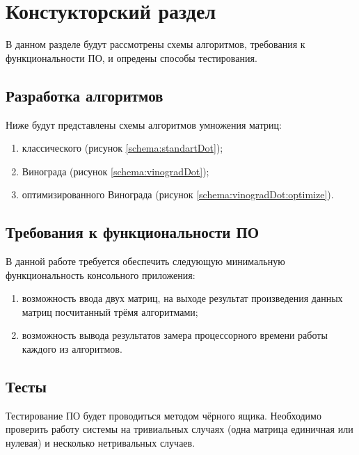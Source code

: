 \chapter{ Констукторский раздел}
\label{cha:design}
    В данном разделе будут рассмотрены схемы алгоритмов, требования к функциональности ПО,
    и опредены способы тестирования.
    
    \section{Разработка алгоритмов}
        Ниже будут представлены схемы алгоритмов умножения матриц: \begin{enumerate}
            \item классического (рисунок \ref{schema:standartDot});
            \item Винограда (рисунок \ref{schema:vinogradDot});
            \item оптимизированного Винограда (рисунок \ref{schema:vinogradDot:optimize}).
        \end{enumerate}


    \section{Требования к функциональности ПО}
        В данной работе требуется обеспечить следующую минимальную функциональность консольного приложения:
        \begin{enumerate}
            \item возможность ввода двух матриц, на выходе результат произведения данных матриц посчитанный трёмя алгоритмами;
            \item возможность вывода результатов замера процессорного времени работы каждого из алгоритмов. 
        \end{enumerate}

    \section{Тесты}
    Тестирование ПО будет проводиться методом чёрного ящика. Необходимо проверить работу системы 
    на тривиальных случаях (одна матрица единичная или нулевая) 
    и несколько нетривальных случаев.


\newpage